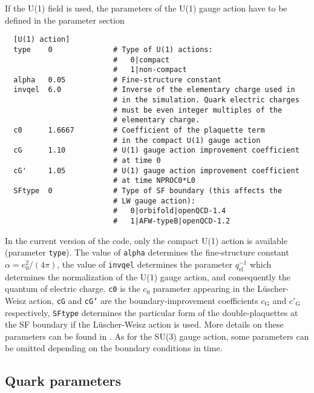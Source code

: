 \documentclass[11pt,fleqn]{article}
\begin{document}
If the U(1) field is used, the parameters of the U(1) gauge action have to be
defined in the parameter section
%
\begin{verbatim}
  [U(1) action]
  type    0              # Type of U(1) actions:
                         #   0|compact
                         #   1|non-compact
  alpha   0.05           # Fine-structure constant
  invqel  6.0            # Inverse of the elementary charge used in
                         # in the simulation. Quark electric charges
                         # must be even integer multiples of the
                         # elementary charge.
  c0      1.6667         # Coefficient of the plaquette term
                         # in the compact U(1) gauge action
  cG      1.10           # U(1) gauge action improvement coefficient
                         # at time 0
  cG'     1.05           # U(1) gauge action improvement coefficient
                         # at time NPROC0*L0
  SFtype  0              # Type of SF boundary (this affects the
                         # LW gauge action):
                         #   0|orbifold|openQCD-1.4
                         #   1|AFW-typeB|openQCD-1.2
\end{verbatim}
%
In the current version of the code, only the compact U(1) action is available
(parameter \texttt{type}). The value of \texttt{alpha} determines the
fine-structure constant $\alpha = e_0^2/(4\pi)$, the value of \texttt{invqel}
determines the parameter $q_\text{el}^{-1}$ which determines the normalization
of the U(1) gauge action, and consequently the quantum of electric charge.
\texttt{c0} is the $c_0$ parameter appearing in the L\"uscher-Weisz action,
\texttt{cG} and \texttt{cG'} are the boundary-improvement coefficients
$c_\text{G}$ and $c'_\text{G}$ respectively, \texttt{SFtype} determines the
particular form of the double-plaquettes at the SF boundary if the
L\"uscher-Weisz action is used. More details on these parameters can be found in
\cite{gauge_action}. As for the SU(3) gauge action, some parameters can be
omitted depending on the boundary conditions in time.



\subsection{Quark parameters}
\label{subsec:actions:quarkparms}
\end{document}
